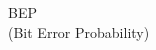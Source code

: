 \documentclass[preview]{standalone}
\begin{document}
\begin{center}
BEP\\(Bit Error Probability)
\end{center}
\end{document}
